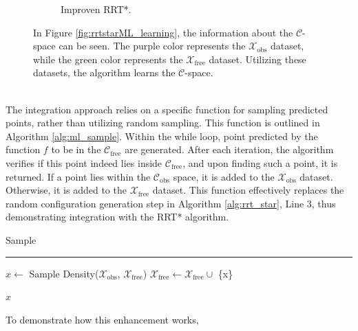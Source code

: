 \documentclass{ctuthesis}
\begin{document}
\begin{figure}[!ht]
\begin{subfigure}[b]{0.45\textwidth}
      \caption{Improven RRT*.}
  \end{subfigure}
  \caption{In Figure \ref{fig:rrtstarML_learning}, 
  the information about the $\mathcal{C}$-space can be seen. 
  The purple color represents the \( \mathcal{X}_{\text{obs}} \) dataset, 
  while the green color represents the \( \mathcal{X}_{\text{free}} \) dataset. 
  Utilizing these datasets, the algorithm learns the $\mathcal{C}$-space.}
  \label{fig:LearningConfigSpace}
\end{figure}
\\[12pt]
The integration approach relies on a specific function for sampling predicted points,
rather than utilizing random sampling. 
This function is outlined in Algorithm \ref{alg:ml_sample}. 
Within the while loop, 
point predicted by the function $f$ to be in the $\mathcal{C}_{\text{free}}$ are generated. 
After each iteration, 
the algorithm verifies if this point indeed lies inside $\mathcal{C}_{\text{free}}$, 
and upon finding such a point, it is returned. 
If a point lies within the $\mathcal{C}_{\text{obs}}$ space, 
it is added to the $\mathcal{X}_{\text{obs}}$ dataset.
Otherwise, it is added to the $\mathcal{X}_{\text{free}}$ dataset.
This function effectively replaces the random configuration generation step 
in Algorithm \ref{alg:rrt_star}, Line 3, thus demonstrating integration with the RRT* algorithm.
\\[12pt] 
\begin{algorithm}[H]
  \caption{Sample}
  \label{alg:ml_sample}
  \vspace{0.1cm}
  \hrule
  \vspace{0.2cm}
  $x \gets$ Sample Density($\mathcal{X}_{\text{obs}}$, $\mathcal{X}_{\text{free}}$)\; 
  $\mathcal{X}_{\text{free}} \gets \mathcal{X}_{\text{free}} \cup$ \{x\}\;
  
  \Return $x$\;
\end{algorithm}
\vspace{1em}
\noindent To demonstrate how this enhancement works, 
\end{document}
